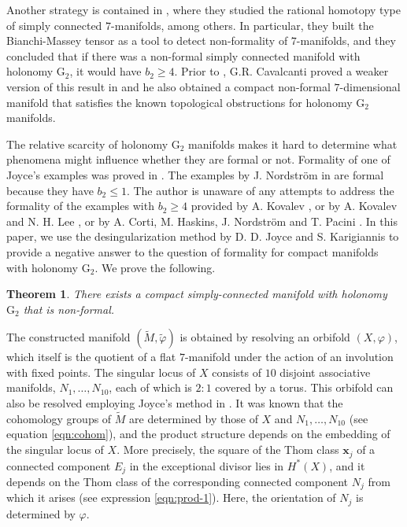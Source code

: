 \documentclass[10pt]{article}
\newcommand{\Gtwo}{\mathrm{G}_2}
\theoremstyle{plain}
\newtheorem{theorem}[proposition]{Theorem}
\theoremstyle{definition}
\theoremstyle{remark}
\begin{document}
Another strategy is contained in \cite{CN}, where they studied the rational homotopy type of simply connected $7$-manifolds, among others. In particular, they built the Bianchi-Massey tensor as a tool to detect non-formality of $7$-manifolds, and they 
concluded that if there was a non-formal simply connected manifold with holonomy $\Gtwo$, it would have $b_2 \geq 4$.  Prior to \cite{CN}, G.R. Cavalcanti proved a weaker version of this result in \cite{Cavalcanti} and he also obtained a compact non-formal $7$-dimensional manifold that satisfies the known topological obstructions for holonomy $\Gtwo$ manifolds. 

The
 relative scarcity of holonomy $\Gtwo$ manifolds makes it hard to determine what phenomena might influence whether they are formal or not. Formality of one of Joyce's examples was proved in \cite{AT}. The examples by J. Nordström in \cite{Nord} are formal because they have $b_2 \leq 1$. 
 The author is unaware of any attempts to address the formality of the examples with
$b_2\geq 4$ provided by A. Kovalev \cite{Kovalev}, or by A. Kovalev and N. H. Lee \cite{KL}, or by  A. Corti, M. Haskins, J. Nordström and T. Pacini \cite{CHNP}.
In this paper, we use the desingularization method by D. D. Joyce and S. Karigiannis \cite{JK} to provide a negative answer to the question of formality for compact manifolds with holonomy $\Gtwo$. We prove the following.

\begin{theorem}
There exists a compact simply-connected manifold with holonomy $\Gtwo$ that is non-formal.
\end{theorem}


The constructed manifold $(\widetilde{M}, \widetilde{\varphi})$ is obtained by resolving an orbifold $(X,\varphi)$, which itself is the quotient of a flat $7$-manifold under the action of an involution with fixed points. The singular locus of $X$ consists of $10$ disjoint associative manifolds, $N_1, \dots, N_{10}$, each of which is $2:1$ covered by a torus. This orbifold can also be resolved employing Joyce's method in \cite{J2}.
It was known that the cohomology groups of $\widetilde{M}$ are determined by those of $X$ and $N_1, \dots, N_{10}$ (see equation \eqref{eqn:cohom}), and the product structure depends on the embedding of the singular locus of $X$. 
More precisely, the square of the Thom class $\mathbf{x}_j$ of a connected component $E_j$ in the exceptional divisor lies in $H^*(X)$, and it depends on the Thom class of the corresponding connected component $N_j$ from which it arises (see expression \eqref{eqn:prod-1}). Here, the orientation of $N_j$ is determined by $\varphi$.
\end{document}
